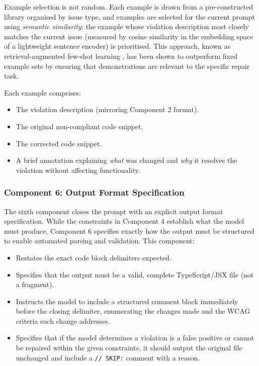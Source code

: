 Example selection is not random.  Each example is drawn from a pre-constructed
library organised by issue type, and examples are selected for the current
prompt using \emph{semantic similarity}: the example whose violation
description most closely matches the current issue (measured by cosine
similarity in the embedding space of a lightweight sentence encoder) is
prioritised.  This approach, known as retrieval-augmented few-shot learning
\cite{min2022rethinking}, has been shown to outperform fixed example sets
by ensuring that demonstrations are relevant to the specific repair task.

Each example comprises:
\begin{itemize}
  \item The violation description (mirroring Component 2 format).
  \item The original non-compliant code snippet.
  \item The corrected code snippet.
  \item A brief annotation explaining \emph{what} was changed and \emph{why}
    it resolves the violation without affecting functionality.
\end{itemize}

\subsubsection{Component 6: Output Format Specification}

The sixth component closes the prompt with an explicit output format
specification.  While the constraints in Component 4 establish what the model
must produce, Component 6 specifies exactly how the output must be structured
to enable automated parsing and validation.  This component:

\begin{itemize}
  \item Restates the exact code block delimiters expected.
  \item Specifies that the output must be a valid, complete TypeScript/JSX
    file (not a fragment).
  \item Instructs the model to include a structured comment block immediately
    before the closing delimiter, enumerating the changes made and the WCAG
    criteria each change addresses.
  \item Specifies that if the model determines a violation is a false
    positive or cannot be repaired within the given constraints, it should
    output the original file unchanged and include a \texttt{// SKIP:}
    comment with a reason.
\end{itemize}


